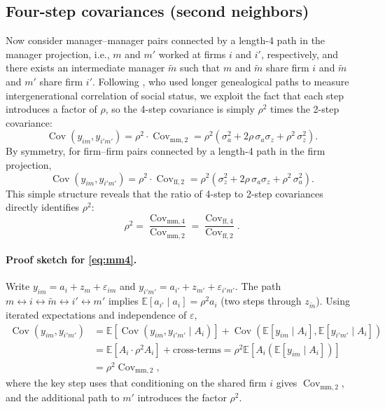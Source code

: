 \documentclass[11pt]{article}
\begin{document}
\subsection{Four-step covariances (second neighbors)}
Now consider manager--manager pairs connected by a length-4 path in the manager projection, i.e., $m$ and $m'$ worked at firms $i$ and $i'$, respectively, and there exists an intermediate manager $\tilde m$ such that $m$ and $\tilde m$ share firm $i$ and $\tilde m$ and $m'$ share firm $i'$. Following \citet{Clark2023}, who used longer genealogical paths to measure intergenerational correlation of social status, we exploit the fact that each step introduces a factor of $\rho$, so the 4-step covariance is simply $\rho^2$ times the 2-step covariance:
\begin{equation}
\label{eq:mm4}
 \operatorname{Cov}(y_{im}, y_{i'm'}) = \rho^2 \cdot \operatorname{Cov}_{\text{mm},2} = \rho^2(\sigma_a^2 + 2\rho\,\sigma_a\sigma_z + \rho^2\,\sigma_z^2).
\end{equation}
By symmetry, for firm--firm pairs connected by a length-4 path in the firm projection,
\begin{equation}
\label{eq:ff4}
 \operatorname{Cov}(y_{im}, y_{i'm'}) = \rho^2 \cdot \operatorname{Cov}_{\text{ff},2} = \rho^2(\sigma_z^2 + 2\rho\,\sigma_a\sigma_z + \rho^2\,\sigma_a^2).
\end{equation}
This simple structure reveals that the ratio of 4-step to 2-step covariances directly identifies $\rho^2$:
\begin{equation}
\label{eq:rho-ratio}
 \rho^2 = \frac{\operatorname{Cov}_{\text{mm},4}}{\operatorname{Cov}_{\text{mm},2}} = \frac{\operatorname{Cov}_{\text{ff},4}}{\operatorname{Cov}_{\text{ff},2}}.
\end{equation}

\paragraph{Proof sketch for \eqref{eq:mm4}.} Write $y_{im}=a_i+z_m+\varepsilon_{im}$ and $y_{i'm'}=a_{i'}+z_{m'}+\varepsilon_{i'm'}$. The path $m \leftrightarrow i \leftrightarrow \tilde m \leftrightarrow i' \leftrightarrow m'$ implies $\mathbb{E}[a_{i'}\mid a_i] = \rho^2 a_i$ (two steps through $z_{\tilde m}$). Using iterated expectations and independence of $\varepsilon$,
\begin{align*}
 \operatorname{Cov}(y_{im}, y_{i'm'}) &= \mathbb{E}[\operatorname{Cov}(y_{im}, y_{i'm'} \mid A_i)] + \operatorname{Cov}(\mathbb{E}[y_{im}\mid A_i], \mathbb{E}[y_{i'm'}\mid A_i]) \\
 &= \mathbb{E}[A_i \cdot \rho^2 A_i] + \text{cross-terms} = \rho^2 \mathbb{E}[A_i(\mathbb{E}[y_{im}\mid A_i])] \\
 &= \rho^2 \operatorname{Cov}_{\text{mm},2},
\end{align*}
where the key step uses that conditioning on the shared firm $i$ gives $\operatorname{Cov}_{\text{mm},2}$, and the additional path to $m'$ introduces the factor $\rho^2$.
\end{document}
